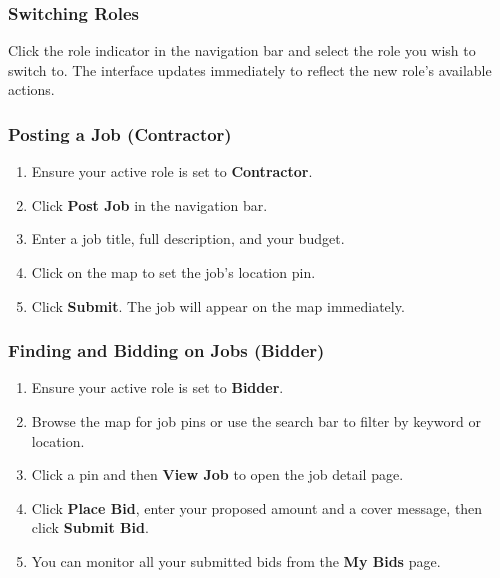 \documentclass[11pt]{article}
\begin{document}
\subsubsection{Switching Roles}
Click the role indicator in the navigation bar and select the role you wish to switch to. The interface updates immediately to reflect the new role's available actions.

\subsubsection{Posting a Job (Contractor)}
\begin{enumerate}[leftmargin=1.8em]
  \item Ensure your active role is set to \textbf{Contractor}.
  \item Click \textbf{Post Job} in the navigation bar.
  \item Enter a job title, full description, and your budget.
  \item Click on the map to set the job's location pin.
  \item Click \textbf{Submit}. The job will appear on the map immediately.
\end{enumerate}

\subsubsection{Finding and Bidding on Jobs (Bidder)}
\begin{enumerate}[leftmargin=1.8em]
  \item Ensure your active role is set to \textbf{Bidder}.
  \item Browse the map for job pins or use the search bar to filter by keyword or location.
  \item Click a pin and then \textbf{View Job} to open the job detail page.
  \item Click \textbf{Place Bid}, enter your proposed amount and a cover message, then click \textbf{Submit Bid}.
  \item You can monitor all your submitted bids from the \textbf{My Bids} page.
\end{enumerate}
\end{document}
